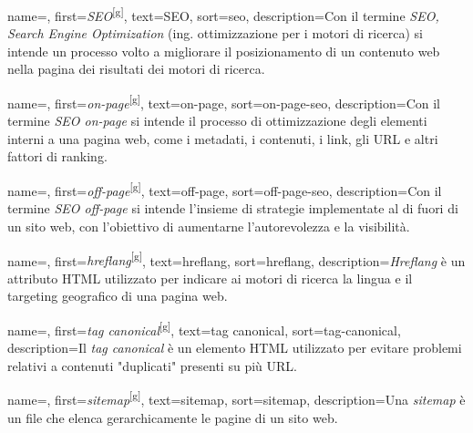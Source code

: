 

 {
    name=,
    first={\textit{SEO}\textsuperscript{[g]}},
    text=SEO,
    sort=seo,
    description={Con il termine \emph{SEO, Search Engine Optimization} (ing. ottimizzazione per i motori di ricerca) si intende un processo volto a migliorare il posizionamento di un contenuto web nella pagina dei risultati dei motori di ricerca.}
}

 {
    name=,
    first={\textit{on-page}\textsuperscript{[g]}},
    text=on-page,
    sort=on-page-seo,
    description={Con il termine \emph{SEO on-page} si intende il processo di ottimizzazione degli elementi interni a una pagina web, come i metadati, i contenuti, i link, gli URL e altri fattori di ranking.}
}

 {
    name=,
    first={\textit{off-page}\textsuperscript{[g]}},
    text=off-page,
    sort=off-page-seo,
    description={Con il termine \emph{SEO off-page} si intende l'insieme di strategie implementate al di fuori di un sito web, con l'obiettivo di aumentarne l'autorevolezza e la visibilità.}
}

 {
    name=,
    first={\textit{hreflang}\textsuperscript{[g]}},
    text=hreflang,
    sort=hreflang,
    description={\emph{Hreflang} è un attributo HTML utilizzato per indicare ai motori di ricerca la lingua e il targeting geografico di una pagina web.}
}

 {
    name=,
    first={\textit{tag canonical}\textsuperscript{[g]}},
    text=tag canonical,
    sort=tag-canonical,
    description={Il \emph{tag canonical} è un elemento HTML utilizzato per evitare problemi relativi a contenuti "duplicati" presenti su più URL.}
}

 {
    name=,
    first={\textit{sitemap}\textsuperscript{[g]}},
    text=sitemap,
    sort=sitemap,
    description={Una \emph{sitemap} è un file che elenca gerarchicamente le pagine di un sito web.}
}

